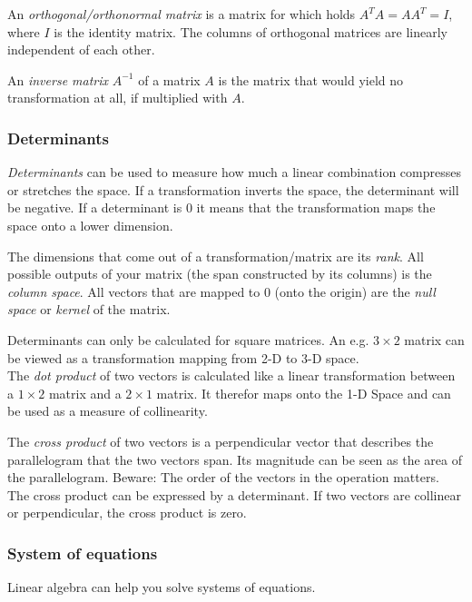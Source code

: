 \documentclass[
]{book}
\begin{document}
An \emph{orthogonal/orthonormal matrix} is a matrix for which holds
\(A^TA=AA^T=I\), where \(I\) is the identity matrix. The columns of
orthogonal matrices are linearly independent of each other.

An \emph{inverse matrix} \(A^{-1}\) of a matrix \(A\) is the matrix that would
yield no transformation at all, if multiplied with \(A\).

\hypertarget{determinants}{%
\subsubsection{Determinants}\label{determinants}}

\emph{Determinants} can be used to measure how much a linear combination
compresses or stretches the space. If a transformation inverts the
space, the determinant will be negative. If a determinant is 0 it means
that the transformation maps the space onto a lower dimension.

The dimensions that come out of a transformation/matrix are its \emph{rank}.
All possible outputs of your matrix (the span constructed by its
columns) is the \emph{column space}. All vectors that are mapped to 0 (onto
the origin) are the \emph{null space} or \emph{kernel} of the matrix.

Determinants can only be calculated for square matrices. An e.g.
\(3 \times 2\) matrix can be viewed as a transformation mapping from 2-D
to 3-D space.\\

The \emph{dot product} of two vectors is calculated like a linear
transformation between a \(1 \times 2\) matrix and a \(2 \times 1\) matrix.
It therefor maps onto the 1-D Space and can be used as a measure of
collinearity.

The \emph{cross product} of two vectors is a perpendicular vector that
describes the parallelogram that the two vectors span. Its magnitude can
be seen as the area of the parallelogram. Beware: The order of the
vectors in the operation matters. The cross product can be expressed by
a determinant. If two vectors are collinear or perpendicular, the cross
product is zero.

\hypertarget{system-of-equations}{%
\subsubsection{System of equations}\label{system-of-equations}}

Linear algebra can help you solve systems of equations.
\end{document}

